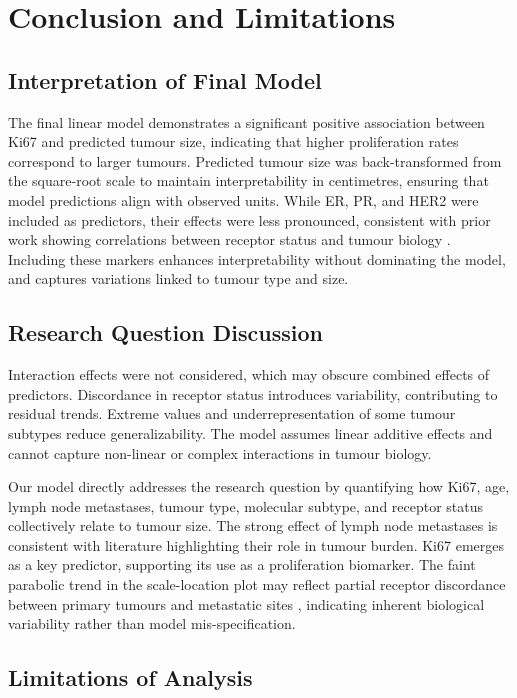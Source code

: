 \documentclass[letter]{article}
\begin{document}
\section{Conclusion and Limitations}
\subsection{Interpretation of Final Model}

The final linear model demonstrates a significant positive association between Ki67 and predicted tumour size, indicating that higher proliferation rates correspond to larger tumours. 
Predicted tumour size was back-transformed from the square-root scale to maintain interpretability in centimetres, ensuring that model predictions align with observed units. While ER, PR, and HER2 were included as predictors, their effects were less pronounced, 
consistent with prior work showing correlations between receptor status and tumour biology \cite{Kozakiewicz2013}. Including these markers enhances interpretability without dominating the model, 
and captures variations linked to tumour type and size. \cite{Thakar2011}

\subsection{Research Question Discussion}

Interaction effects were not considered, which may obscure combined effects of predictors. Discordance in receptor status \cite{Walter2020} introduces variability, contributing to residual trends. 
Extreme values and underrepresentation of some tumour subtypes reduce generalizability. The model assumes linear additive effects and cannot capture non-linear or complex interactions in tumour biology.

Our model directly addresses the research question by quantifying how Ki67, age, lymph node metastases, tumour type, molecular subtype, and receptor status collectively relate to tumour size. 
The strong effect of lymph node metastases is consistent with literature highlighting their role in tumour burden. Ki67 emerges as a key predictor, supporting its use as a proliferation biomarker. The faint parabolic trend in the scale-location plot may reflect 
partial receptor discordance between primary tumours and metastatic sites \cite{Walter2020}, indicating inherent biological variability rather than model mis-specification.

\subsection{Limitations of Analysis}
\end{document}

